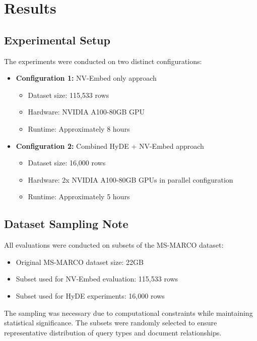 \chapter{Results}
\label{C4} %
\clearpage
\section{Experimental Setup}
The experiments were conducted on two distinct configurations:

\begin{itemize}
    \item \textbf{Configuration 1:} NV-Embed only approach
    \begin{itemize}
        \item Dataset size: 115,533 rows
        \item Hardware: NVIDIA A100-80GB GPU
        \item Runtime: Approximately 8 hours
    \end{itemize}
    
    \item \textbf{Configuration 2:} Combined HyDE + NV-Embed approach
    \begin{itemize}
        \item Dataset size: 16,000 rows
        \item Hardware: 2x NVIDIA A100-80GB GPUs in parallel configuration
        \item Runtime: Approximately 5 hours
    \end{itemize}
\end{itemize}

\section{Dataset Sampling Note}
All evaluations were conducted on subsets of the MS-MARCO dataset:
\begin{itemize}
    \item Original MS-MARCO dataset size: 22GB
    \item Subset used for NV-Embed evaluation: 115,533 rows
    \item Subset used for HyDE experiments: 16,000 rows
\end{itemize}

The sampling was necessary due to computational constraints while maintaining statistical significance. The subsets were randomly selected to ensure representative distribution of query types and document relationships.

